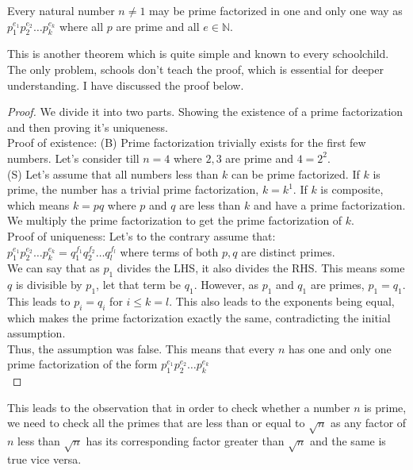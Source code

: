 \begin{theorem}
    Every natural number $n \neq 1$ may be prime factorized in one and only one way as $p_1^{e_1}p_2^{e_2}\dots p_k^{e_k}$ where all $p$ are prime and all $e \in \mathbb{N}$.
\end{theorem}
This is another theorem which is quite simple and known to every schoolchild. The only problem, schools don't teach the proof, which is essential for deeper understanding. I have discussed the proof below.\\
\begin{proof}
    We divide it into two parts. Showing the existence of a prime factorization and then proving it's uniqueness.\\
    Proof of existence: (B) Prime factorization trivially exists for the first few numbers. Let's consider till $n=4$ where $2,3$ are prime and $4=2^2$.\\
    (S) Let's assume that all numbers less than $k$ can be prime factorized. If $k$ is prime, the number has a trivial prime factorization, $k=k^1$. If $k$ is composite, which means $k=pq$ where $p$ and $q$ are less than $k$ and have a prime factorization. We multiply the prime factorization to get the prime factorization of $k$.\\
    Proof of uniqueness: Let's to the contrary assume that:\\
    $p_1^{e_1}p_2^{e_2}\dots p_k^{e_k}=q_1^{f_1}q_2^{f_2}\dots q_l^{f_l}$ where terms of both $p,q$ are distinct primes.\\
    We can say that as $p_1$ divides the LHS, it also divides the RHS. This means some $q$ is divisible by $p_1$, let that term be $q_1$. However, as $p_1$ and $q_1$ are primes, $p_1=q_1$. This leads to $p_i=q_i$ for $i \leq k=l$. This also leads to the exponents being equal, which makes the prime factorization exactly the same, contradicting the initial assumption.\\
    Thus, the assumption was false. This means that every $n$ has one and only one prime factorization of the form $p_1^{e_1}p_2^{e_2}\dots p_k^{e_k}$\\
\end{proof}
This leads to the observation that in order to check whether a number $n$ is prime, we need to check all the primes that are less than or equal to $\sqrt{n}$ as any factor of $n$ less than $\sqrt{n}$ has its corresponding factor greater than $\sqrt{n}$ and the same is true vice versa.\\
